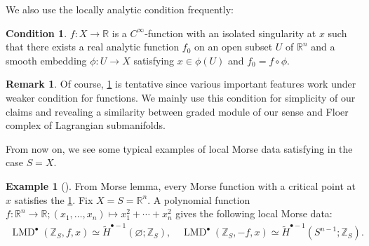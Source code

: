 \documentclass[a4paper,dvipdfmx,reqno,12pt]{amsart}
\theoremstyle{definition}
\newtheorem{definition}[theorem]{Definition}
\newtheorem{example}[theorem]{Example}
\newtheorem{remark}[theorem]{Remark}
\newtheorem{condition}[theorem]{Condition}
\newcommand{\emp}{\varnothing}%
\newcommand{\Z}{\mathbb{Z}}%
\newcommand{\opn}[1]{\operatorname{#1}}
\numberwithin{equation}{section}
\begin{document}

We also use the locally analytic condition frequently:

\begin{condition}
\label{condition-local-analytic}
$f\colon X\to \mathbb{R}$ is a $C^{\infty}$-function
with an isolated singularity at $x$ such that 
there exists a real analytic function $f_0$ on an open 
subset $U$ of $\mathbb{R}^{n}$ and a smooth embedding
$\phi \colon U\to X$ satisfying $x\in \phi(U)$ and
$f_0=f\circ \phi$.
\end{condition}

\iffalse
\begin{definition}

\end{definition}
\fi


\begin{remark}
Of course, \cref{condition-local-analytic} is tentative
since various important
features work under weaker condition for functions. 
We mainly use this condition for
simplicity of our claims and revealing a similarity between
graded module of our sense and Floer complex of Lagrangian 
submanifolds.
\end{remark}

From now on, we see some typical examples of local
Morse data satisfying 
in the case $S=X$.

\begin{example}[{\cite[p.22]{MR2031639}}]
From Morse lemma, every Morse function with a critical 
point at $x$ satisfies the \cref{condition-local-analytic}.
Fix $X=S={\mathbb{R}}^{n}$.
A polynomial function 
$f\colon {\mathbb{R}}^{n}\to {\mathbb{R}};(x_1,\ldots,x_n)\mapsto x_1^{2}+
\cdots+x_n^{2}$ gives the following local Morse data:
\begin{align}
    \opn{LMD}^{\bullet}(\Z_S,f,x)\simeq \tilde{H}^{\bullet-1}(\emp;\Z_S),
    \quad \opn{LMD}^{\bullet}(\Z_S,-f,x) \simeq \tilde{H}^{\bullet-1}(S^{n-1};\Z_S).
  \end{align}
\end{example}
\end{document}
